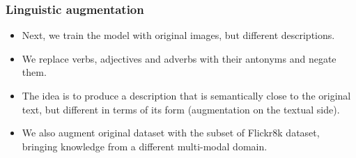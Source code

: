 \documentclass[aspectratio=1610]{beamer} %
\newcommand{\squeezeup}{\vspace{-3mm}}
\newcommand{\squeezedown}{\vspace{2.5mm}}
\begin{document}
\begin{frame}
\frametitle{Linguistic augmentation}

\vspace{-.3cm}
\begin{figure}[htbp]
\centering
{}
  \qquad
\hspace{.5cm}

\label{fig:lingaug}
\end{figure}
\vspace{-.5cm}
\begin{itemize}

	\item Next, we train the model with original images, but different descriptions.
	\item We replace verbs, adjectives and adverbs with their antonyms and negate them.
	\item The idea is to produce a description that is semantically close to the original text, but different in terms of its form (augmentation on the textual side).
	\item We also augment original dataset with the subset of Flickr8k dataset, bringing knowledge from a different multi-modal domain.

\end{itemize}
\end{frame}
\end{document}
